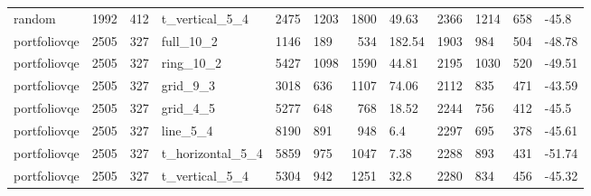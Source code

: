 \begin{longtable}{lrrlllrlllrl}
random & 1992 & 412 & t\_vertical\_5\_4 & 2475 & 1203 & 1800 & 49.63 & 2366 & 1214 & 658 & -45.8 \\
portfoliovqe & 2505 & 327 & full\_10\_2 & 1146 & 189 & 534 & 182.54 & 1903 & 984 & 504 & -48.78 \\
portfoliovqe & 2505 & 327 & ring\_10\_2 & 5427 & 1098 & 1590 & 44.81 & 2195 & 1030 & 520 & -49.51 \\
portfoliovqe & 2505 & 327 & grid\_9\_3 & 3018 & 636 & 1107 & 74.06 & 2112 & 835 & 471 & -43.59 \\
portfoliovqe & 2505 & 327 & grid\_4\_5 & 5277 & 648 & 768 & 18.52 & 2244 & 756 & 412 & -45.5 \\
portfoliovqe & 2505 & 327 & line\_5\_4 & 8190 & 891 & 948 & 6.4 & 2297 & 695 & 378 & -45.61 \\
portfoliovqe & 2505 & 327 & t\_horizontal\_5\_4 & 5859 & 975 & 1047 & 7.38 & 2288 & 893 & 431 & -51.74 \\
portfoliovqe & 2505 & 327 & t\_vertical\_5\_4 & 5304 & 942 & 1251 & 32.8 & 2280 & 834 & 456 & -45.32 \\
\end{longtable}
